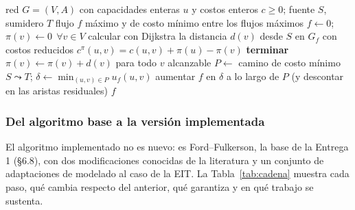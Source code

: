 \documentclass{article}
\begin{document}
\begin{algorithm}[H]
\caption{Successive Shortest Paths con potenciales (implementado en \texttt{ayudantias/flujo.py})}
\label{alg:ssp}
\begin{algorithmic}[1]
\Require red $G=(V,A)$ con capacidades enteras $u$ y costos enteros $c \geq 0$; fuente $S$, sumidero $T$
\Ensure flujo $f$ máximo y de costo mínimo entre los flujos máximos
\State $f \gets 0$; \quad $\pi(v) \gets 0 \ \ \forall v \in V$
\Loop
    \State calcular con Dijkstra la distancia $d(v)$ desde $S$ en $G_f$ con costos reducidos $c^\pi(u,v) = c(u,v) + \pi(u) - \pi(v)$
     \textbf{terminar} \EndIf
    \State $\pi(v) \gets \pi(v) + d(v)$ para todo $v$ alcanzable
    \State $P \gets$ camino de costo mínimo $S \leadsto T$; \quad $\delta \gets \min_{(u,v) \in P} u_f(u,v)$
    \State aumentar $f$ en $\delta$ a lo largo de $P$ (y descontar en las aristas residuales)
\EndLoop
\State \Return $f$
\end{algorithmic}
\end{algorithm}

\subsubsection{Del algoritmo base a la versión implementada}

El algoritmo implementado no es nuevo: es Ford--Fulkerson, la base de la Entrega 1 (§6.8), con dos modificaciones conocidas de la literatura y un conjunto de adaptaciones de modelado al caso de la EIT. La Tabla~\ref{tab:cadena} muestra cada paso, qué cambia respecto del anterior, qué garantiza y en qué trabajo se sustenta.
\end{document}
